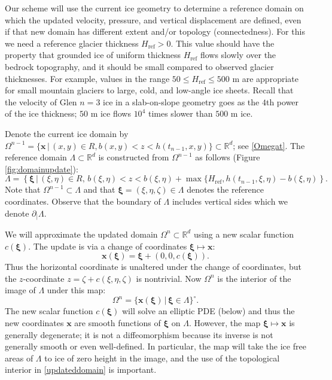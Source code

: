 \documentclass[letterpaper,final,12pt,reqno]{amsart}
\newcommand{\RR}{\mathbb{R}}
\newcommand{\bx}{\mathbf{x}}
\newcommand{\bxi}{\bm{\xi}}
\newcommand{\Href}{H_{\text{ref}}}
\begin{document}
Our scheme will use the current ice geometry to determine a reference domain on which the updated velocity, pressure, and vertical displacement are defined, even if that new domain has different extent and/or topology (connectedness).  For this we need a reference glacier thickness $\Href>0$.  This value should have the property that grounded ice of uniform thickness $\Href$ flows slowly over the bedrock topography, and it should be small compared to observed glacier thicknesses.  For example, values in the range $50 \le \Href \le 500$ m are appropriate for small mountain glaciers to large, cold, and low-angle ice sheets.  Recall that the velocity of Glen $n=3$ ice in a slab-on-slope geometry \cite{GreveBlatter2009} goes as the $4$th power of the ice thickness; $50$ m ice flows $10^4$ times slower than $500$ m ice.

Denote the current ice domain by $\Omega^{n-1}=\{\bx\,\big|\,(x,y)\in R, b(x,y)<z<h(t_{n-1},x,y)\} \subset \RR^d$; see \eqref{Omegat}.  The reference domain $\Lambda \subset \RR^d$ is constructed from $\Omega^{n-1}$ as follows (Figure \ref{fig:domainupdate}):
\begin{equation}
\Lambda = \left\{\bxi\,\big|\,(\xi,\eta)\in R, \, b(\xi,\eta) < z < b(\xi,\eta) + \max\{\Href,h(t_{n-1},\xi,\eta)-b(\xi,\eta)\right\}.  \label{Lambda}
\end{equation}
Note that $\Omega^{n-1} \subset \Lambda$ and that $\bxi=(\xi,\eta,\zeta) \in \Lambda$ denotes the reference coordinates.  Observe that the boundary of $\Lambda$ includes vertical sides which we denote $\partial_{|} \Lambda$.

We will approximate the updated domain $\Omega^n \subset \RR^d$ using a new scalar function $c(\bxi)$.  The update is via a change of coordinates $\bxi \mapsto \bx$:
\begin{equation}
\bx(\bxi) = \bxi + (0,0,c(\bxi)). \label{changecoords}
\end{equation}
Thus the horizontal coordinate is unaltered under the change of coordinates, but the $z$-coordinate $z=\zeta+c(\xi,\eta,\zeta)$ is nontrivial.  Now $\Omega^n$ is the interior of the image of $\Lambda$ under this map:
\begin{equation}
\Omega^n = \{\bx(\bxi) \,\big|\, \bxi \in \Lambda\}^\circ. \label{updateddomain}
\end{equation}
The new scalar function $c(\bxi)$ will solve an elliptic PDE (below) and thus the new coordinates $\bx$ are smooth functions of $\bxi$ on $\Lambda$.  However, the map $\bxi \mapsto \bx$ is generally degenerate; it is not a diffeomorphism because its inverse is not generally smooth or even well-defined.  In particular, the map will take the ice free areas of $\Lambda$ to ice of zero height in the image, and the use of the topological interior in \eqref{updateddomain} is important.
\end{document}
